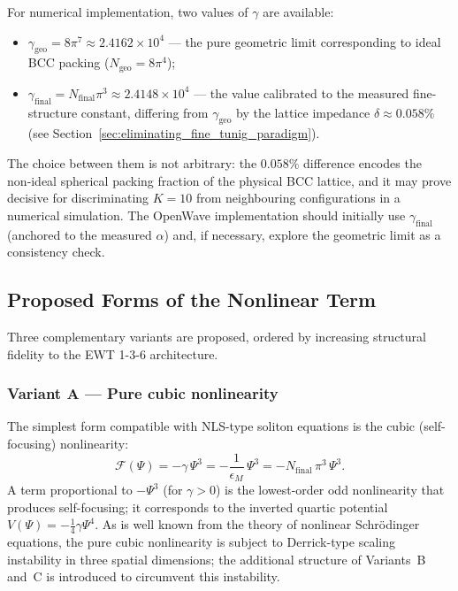 \documentclass[10pt,a4paper]{article}
\begin{document}
For numerical implementation, two values of $\gamma$ are available:
\begin{itemize}
	\item $\gamma_{\text{geo}} = 8\pi^{7} \approx 2.4162 \times 10^{4}$ --- the
	pure geometric limit corresponding to ideal BCC packing ($N_{\text{geo}} =
	8\pi^{4}$);
	\item $\gamma_{\text{final}} = N_{\text{final}}\pi^{3} \approx 2.4148 \times
	10^{4}$ --- the value calibrated to the measured fine-structure constant,
	differing from $\gamma_{\text{geo}}$ by the lattice impedance $\delta
	\approx 0.058\%$ (see Section~\ref{sec:eliminating_fine_tunig_paradigm}).
\end{itemize}
The choice between them is not arbitrary: the $0.058\%$ difference encodes the
non‑ideal spherical packing fraction of the physical BCC lattice, and it may
prove decisive for discriminating $K=10$ from neighbouring configurations in
a numerical simulation.  The OpenWave implementation should initially use
$\gamma_{\text{final}}$ (anchored to the measured $\alpha$) and, if
necessary, explore the geometric limit as a consistency check.

\subsection{Proposed Forms of the Nonlinear Term}

Three complementary variants are proposed, ordered by increasing structural
fidelity to the EWT 1-3-6 architecture.

\subsubsection*{Variant A --- Pure cubic nonlinearity}
The simplest form compatible with NLS-type soliton equations is the cubic
(self-focusing) nonlinearity:
\begin{equation}\label{eq:F_cubic}
	\boxed{\mathcal{F}(\Psi) = -\gamma\,\Psi^{3}
		= -\frac{1}{\epsilon_{M}}\,\Psi^{3}
		= -N_{\text{final}}\,\pi^{3}\,\Psi^{3}} .
\end{equation}
A term proportional to $-\Psi^{3}$ (for $\gamma > 0$) is the lowest-order
odd nonlinearity that produces self-focusing; it corresponds to the
inverted quartic potential $V(\Psi)=-\frac{1}{4}\gamma\Psi^{4}$. As is
well known from the theory of nonlinear Schr\"odinger equations, the pure
cubic nonlinearity is subject to Derrick-type scaling instability in three
spatial dimensions; the additional structure of Variants~B and~C is
introduced to circumvent this instability.
\end{document}
